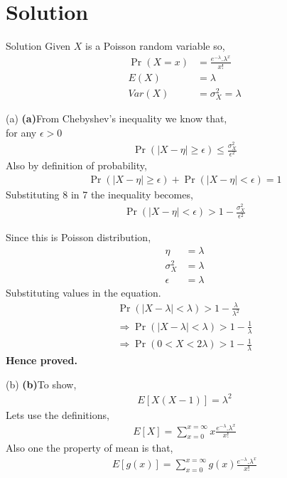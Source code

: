 \documentclass{beamer}
\providecommand{\pr}[1]{\ensuremath{\Pr\left(#1\right)}}
\begin{document}
     \section{Solution}
     \begin{frame}{Solution}
         Given $X$ is a Poisson  random variable so,
     \begin{align}
\pr{X=x}&=\frac{e^{-\lambda}.\lambda^{x}}{x!}\\
         E(X)&=\lambda\\
         Var(X)&=\sigma_{X}^{2}=\lambda
     \end{align}
     \end{frame}
     \begin{frame}{(a)}
     \textbf{(a)}From Chebyshev's inequality we know that,\\
for any $\epsilon>0$
\begin{align}
\pr{|X-\eta|\geq\epsilon}\leq\frac{\sigma_{X}^{2}}{\epsilon^{2}}
\end{align}
Also by definition of probability,
\begin{align}
    \pr{|X-\eta|\geq\epsilon}+\pr{|X-\eta|<\epsilon}=1
    \end{align}
    Substituting 8 in 7 the inequality becomes,
    \begin{align}
        \pr{|X-\eta|<\epsilon}>1-\frac{\sigma_{X}^{2}}{\epsilon^{2}}
    \end{align}
    \end{frame}
    \begin{frame}
     Since this is Poisson distribution,
    \begin{align}
  \eta&=\lambda\\
  \sigma_{X}^{2}&=\lambda\\
  \epsilon&=\lambda
    \end{align}
    Substituting values in the equation.
    \begin{align}
    \pr{|X-\lambda|<\lambda}>1-\frac{\lambda}{\lambda^{2}}\\
    \Rightarrow\pr{|X-\lambda|<\lambda}>1-\frac{1}{\lambda}\\
        \Rightarrow\pr{0<X<2\lambda}>1-\frac{1}{\lambda}
    \end{align}
    \textbf{Hence proved.}
         \end{frame}
         \begin{frame}{(b)}
         \textbf{(b)}To show,
\begin{align}
E[X(X-1)]=\lambda^{2}
\end{align}
Lets use the definitions,
\begin{align}
E[X]=\sum^{x=\infty}_{x=0}x\frac{e^{-\lambda}.\lambda^{x}}{x!}  
\end{align}
Also one the property of mean is that,
\begin{align}
    E[g(x)]=\sum^{x=\infty}_{x=0}g(x)\frac{e^{-\lambda}.\lambda^{x}}{x!}  
\end{align}
    \end{frame}
\end{document}
